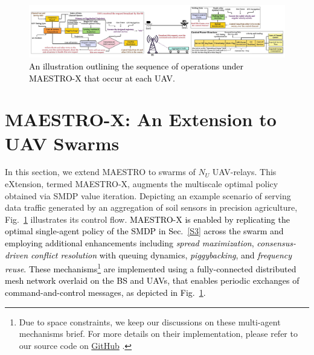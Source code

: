 \documentclass[10pt, twocolumn]{IEEEtran}
\theoremstyle{plain}
\theoremstyle{definition}
\theoremstyle{remark}
\newcommand\hlt[1]{\textcolor{black}{#1}}
\begin{document}
\begin{figure} [t]
    \centering
    \includegraphics[width=1.0\linewidth]{figs/Operational_Model_Updated.jpeg}
    \vspace{-6mm}
    \caption{\hlt{An illustration outlining the sequence of operations under MAESTRO-X that occur at each UAV.}}
    \vspace{-6mm}
    \label{F5}
\end{figure}
\vspace{-4mm}

\section{MAESTRO-X: An Extension to UAV Swarms}\label{S5}
In this section, we extend MAESTRO to swarms of $N_{U}$ UAV-relays. This eXtension, termed MAESTRO-X, augments the multiscale optimal policy obtained via SMDP value iteration. Depicting an example scenario of serving data traffic generated by an aggregation of soil sensors in precision agriculture, Fig.~\ref{F5} illustrates its control flow. 
\hlt{MAESTRO-X is enabled by replicating the optimal single-agent policy of the SMDP in Sec.~\ref{S3} across the swarm and employing additional enhancements including \emph{spread maximization}, \emph{consensus-driven conflict resolution} with queuing dynamics, \emph{piggybacking}, and \emph{frequency reuse}. These mechanisms\footnote{Due to space constraints, we keep our discussions on these multi-agent mechanisms brief. For more details on their implementation, please refer to our source code on \href{https://github.com/bharathkeshavamurthy/MAESTRO-X.git}{GitHub} \cite{MAESTRO-X}.} are implemented using a fully-connected distributed mesh network overlaid on the BS and UAVs,
that enables periodic exchanges of command-and-control messages, as depicted in Fig.~\ref{F5}.}
\end{document}
